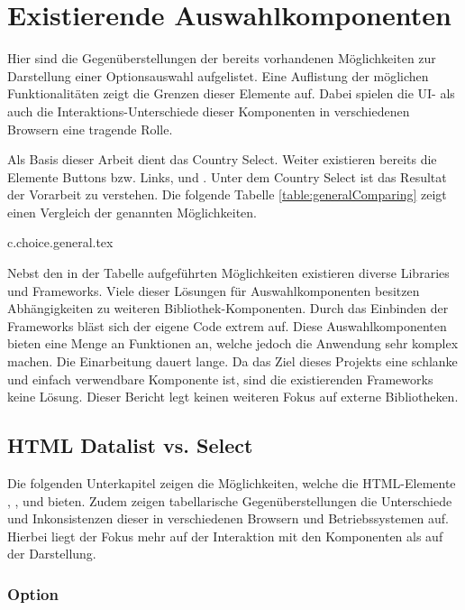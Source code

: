 \chapter{Existierende Auswahlkomponenten}
\label{chap:existingComponents}

Hier sind die Gegenüberstellungen der bereits vorhandenen Möglichkeiten zur Darstellung einer Optionsauswahl aufgelistet. 
Eine Auflistung der möglichen Funktionalitäten zeigt die Grenzen dieser Elemente auf. 
Dabei spielen die UI- als auch die Interaktions-Unterschiede dieser Komponenten in verschiedenen Browsern eine tragende Rolle. 

Als Basis dieser Arbeit dient das Country Select. 
Weiter existieren bereits die Elemente Buttons bzw. Links,  und . 
Unter dem Country Select ist das Resultat der Vorarbeit zu verstehen. 
Die folgende Tabelle \ref{table:generalComparing} zeigt einen Vergleich der genannten Möglichkeiten. 

{c.choice.general.tex}

Nebst den in der Tabelle aufgeführten Möglichkeiten existieren diverse Libraries und Frameworks. 
Viele dieser Lösungen für Auswahlkomponenten besitzen Abhängigkeiten zu weiteren Bibliothek-Komponenten. 
Durch das Einbinden der Frameworks bläst sich der eigene Code extrem auf. 
Diese Auswahlkomponenten bieten eine Menge an Funktionen an, welche jedoch die Anwendung sehr komplex machen. 
Die Einarbeitung dauert lange. 
Da das Ziel dieses Projekts eine schlanke und einfach verwendbare Komponente ist, sind die existierenden Frameworks keine Lösung. 
Dieser Bericht legt keinen weiteren Fokus auf externe Bibliotheken. 


\section{HTML Datalist vs. Select}
\label{sec:datalistSelect}

Die folgenden Unterkapitel zeigen die Möglichkeiten, welche die HTML-Elemente , ,  und  bieten. 
Zudem zeigen tabellarische Gegenüberstellungen die Unterschiede und Inkonsistenzen dieser in verschiedenen Browsern und Betriebssystemen auf. 
Hierbei liegt der Fokus mehr auf der Interaktion mit den Komponenten als auf der Darstellung. 


\subsection{Option}
\label{sec:option}

